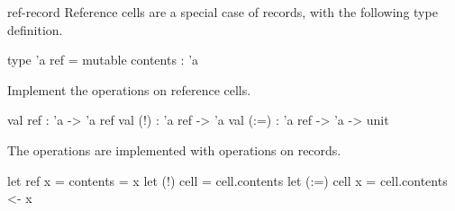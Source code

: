%
%
%
\exercises

%
\begin{exercise}{ref-record}
Reference cells are a special case of records, with the following type definition.

\begin{ocaml}
type 'a ref = { mutable contents : 'a }
\end{ocaml}
%
Implement the operations on reference cells.

\begin{ocaml}
val ref  : 'a -> 'a ref
val (!)  : 'a ref -> 'a
val (:=) : 'a ref -> 'a -> unit
\end{ocaml}

\begin{answer}\ifanswers
The operations are implemented with operations on records.

\begin{ocaml}
let ref x = { contents = x }
let (!) cell = cell.contents
let (:=) cell x = cell.contents <- x
\end{ocaml}
\fi\end{answer}
\end{exercise}

